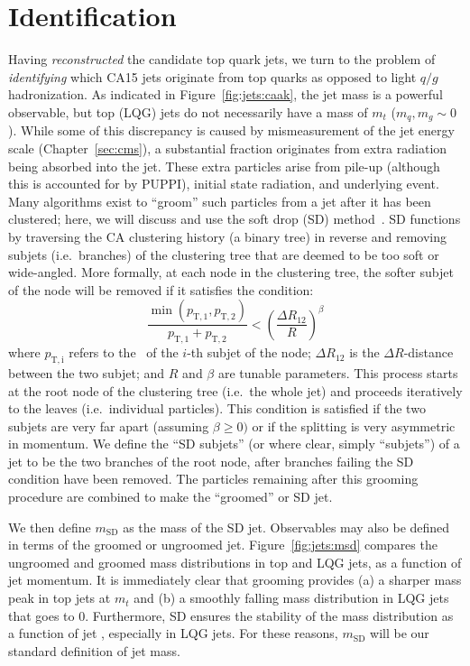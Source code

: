 \section{Identification}
\label{sec:jets:id}

Having \emph{reconstructed} the candidate top quark jets, we turn to the problem of \emph{identifying} which CA15 jets originate from top quarks as opposed to light $q/g$ hadronization. 
As indicated in Figure~\ref{fig:jets:caak}, the jet mass is a powerful observable, but top (LQG) jets do not necessarily have a mass of $m_t$ ($m_q,m_g\sim 0$). 
While some of this discrepancy is caused by mismeasurement of the jet energy scale (Chapter~\ref{sec:cms}), a substantial fraction originates from extra radiation being absorbed into the jet.
These extra particles arise from pile-up (although this is accounted for by PUPPI), initial state radiation, and underlying event.
Many algorithms exist to ``groom'' such particles from a jet after it has been clustered; here, we will discuss and use the soft drop (SD) method~\needcite.
SD functions by traversing the CA clustering history (a binary tree) in reverse and removing subjets (i.e.~branches) of the clustering tree that are deemed to be too soft or wide-angled.
More formally, at each node in the clustering tree, the softer subjet of the node will be removed if it satisfies the condition:
\begin{equation}
    \frac{\min(p_\mathrm{T,1},p_\mathrm{T,2})}{p_\mathrm{T,1}+p_\mathrm{T,2}} < 
    \left(\frac{\Delta R_{12}}{R}\right)^\beta
\end{equation}
where $p_\mathrm{T,i}$ refers to the \pt~of the $i$-th subjet of the node; $\Delta R_{12}$ is the $\Delta R$-distance between the two subjet; and $R$ and $\beta$ are tunable parameters. 
This process starts at the root node of the clustering tree (i.e.~the whole jet) and proceeds iteratively to the leaves (i.e.~individual particles).
This condition is satisfied if the two subjets are very far apart (assuming $\beta \geq 0)$ or if the splitting is very asymmetric in momentum. 
We define the ``SD subjets'' (or where clear, simply ``subjets'') of a jet to be the two branches of the root node, after branches failing the SD condition have been removed. 
The particles remaining after this grooming procedure are combined to make the ``groomed'' or SD jet. 

We then define $m_\mathrm{SD}$ as the mass of the SD jet. 
Observables may also be defined in terms of the groomed or ungroomed jet. 
Figure~\ref{fig:jets:msd} compares the ungroomed and groomed mass distributions in top and LQG jets, as a function of jet momentum. 
It is immediately clear that grooming provides (a) a sharper mass peak in top jets at $m_t$ and (b) a smoothly falling mass distribution in LQG jets that goes to 0.
Furthermore, SD ensures the stability of the mass distribution as a function of jet \pt, especially in LQG jets.
For these reasons, $m_\mathrm{SD}$ will be our standard definition of jet mass. 


